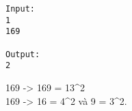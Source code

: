 \begin{verbatim}
Input:
1
169

Output:
2
\end{verbatim}

169 -> 169 = 13^2
\\169 -> 16 = 4^2 và 9 = 3^2.